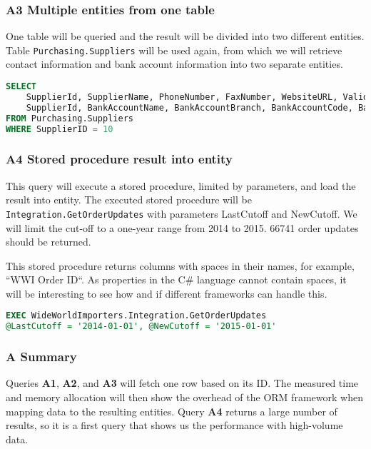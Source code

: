 \subsubsection*{A3 Multiple entities from one table}
One table will be queried and the result will be divided into two different entities. 
Table \texttt{Purchasing.Suppliers} will be used again, from which we will retrieve contact information and bank account information into two separate entities. 

\begin{lstlisting}[language=SQL]
SELECT 
    SupplierId, SupplierName, PhoneNumber, FaxNumber, WebsiteURL, ValidFrom, ValidTo, 
    SupplierId, BankAccountName, BankAccountBranch, BankAccountCode, BankAccountNumber, BankInternationalCode 
FROM Purchasing.Suppliers 
WHERE SupplierID = 10
\end{lstlisting}

\subsubsection*{A4 Stored procedure result into entity}
This query will execute a stored procedure, limited by parameters, and load the result into entity.
The executed stored procedure will be \texttt{Integration.GetOrderUpdates} with parameters LastCutoff and NewCutoff. 
We will limit the cut-off to a one-year range from 2014 to 2015. 66741 order updates should be returned.

This stored procedure returns columns with spaces in their names, for example, ``WWI Order ID``. As properties in the C\# language cannot contain spaces, it will be interesting to see how and if different frameworks can handle this.

\begin{lstlisting}[language=SQL]
EXEC WideWorldImporters.Integration.GetOrderUpdates 
@LastCutoff = '2014-01-01', @NewCutoff = '2015-01-01'
\end{lstlisting}

\subsubsection*{A Summary}
Queries \textbf{A1}, \textbf{A2}, and \textbf{A3} will fetch one row based on its ID. The measured time and memory allocation will then show the overhead of the ORM framework when mapping data to the resulting entities. Query \textbf{A4} returns a large number of results, so it is a first query that shows us the performance with high-volume data.

